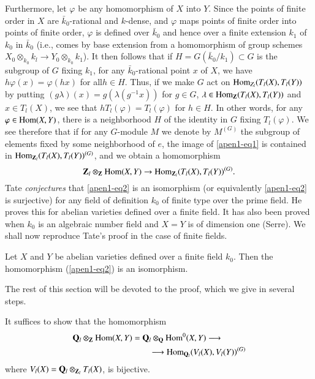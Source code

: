 Furthermore, let $\varphi$ be any homomorphism of $X$ into $Y$. Since the points of finite order in $X$ are $\bar{k}_0$-rational and $k$-dense, and $\varphi$ maps points of finite order into points of finite order, $\varphi$ is defined over $\bar{k}_0$ and hence over a finite extension $k_1$ of $k_0$ in $\bar{k}_0$ (i.e., comes by base extension from a homomorphism of group schemes $X_0 \otimes_{k_0} k_l \to Y_0 \otimes_{k_0} k_1$). It then follows that if $H = G (\bar{k}_0/ k_1) \subset G$ is the subgroup of $G$ fixing $k_1$, for any $\bar{k}_0$-rational point $x$ of $X$, we have $h \varphi(x) = \varphi (hx)$ for all\pageoriginale $h \in H$. Thus, if we make $G$ act on $\operatorname{Hom}_{Z_l} (T_l(X), T_l(Y))$ by putting $(g\lambda) (x) = g(\lambda (g^{-1} x))$ for $g \in G$, $\lambda \in \operatorname{Hom}_{\mathbf{Z}} (T_l (X), T_l(Y))$ and $x \in T_l (X)$, we see that $h T_l (\varphi) = T_l (\varphi)$ for $h \in H$. In other words, for any $\varphi \in \operatorname{Hom} (X,Y)$, there is a neighborhood $H$ of the identity in $G$ fixing $T_l(\varphi)$. We see therefore that if for any $G$-module $M$ we denote by $M^{(G)}$ the subgroup of elements fixed by some neighborhood of $e$, the image of \eqref{apen1-eq1} is contained in $\operatorname{Hom}_{\mathbf{Z}_l} (T_l(X), T_l(Y))^{(G)}$, and we obtain a homomorphism 
\begin{equation}
\mathbf{Z}_l \otimes_{\mathbf{Z}} \operatorname{Hom} (X,Y) \to \operatorname{Hom}_{\mathbf{Z}_l } (T_l(X), T_l(Y))^{(G)}. \label{apen1-eq2}
\end{equation}
Tate {\em conjectures} that \eqref{apen1-eq2} is an isomorphism (or equivalently \eqref{apen1-eq2} is surjective) for any field of definition $k_0$ of finite type over the prime field. He proves this for abelian varieties defined over a finite field. It has also been proved when $k_0$ is an algebraic number field and $X=Y$ is of dimension one (Serre). We shall now reproduce Tate's proof in the case of finite fields.

\begin{thm}\label{apen1-thm1}
Let $X$ and $Y$ be abelian varieties defined over a finite field $k_0$. Then the homomorphism (\eqref{apen1-eq2}) is an isomorphism.
\end{thm}

The rest of this section will be devoted to the proof, which we give in several steps.

\begin{romanstep}\label{apen1-step1}
 It suffices to show that the homomorphism
\begin{align}
\mathbf{Q}_l \otimes_{\mathbf{Z}} \operatorname{Hom} (X, Y) & = \mathbf{Q}_l \otimes_{\mathbf{Q}} \operatorname{Hom}^0 (X,Y) \longrightarrow \notag\\
& \qquad \longrightarrow \operatorname{Hom}_{\mathbf{Q}_l} (V_l (X), V_l (Y))^{(G)} \label{apen1-eq3}
\end{align}
 where $V_l(X) = \mathbf{Q}_l \otimes_{\mathbf{Z}_l} T_l(X)$, is bijective.
 \end{romanstep}

